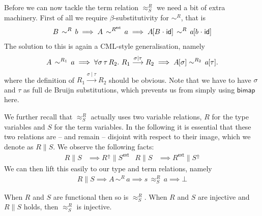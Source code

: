 \documentclass[a4paper,UKenglish]{lipics-v2016}
\newcommand{\ms}{\,}
\newcommand{\mAll}[1]{\ensuremath{\forall} #1.\ms\ms}
\newcommand{\tyr}{\mathrel{\sim}}
\newcommand{\tmr}{\mathrel{\approx}}
\newcommand{\Rext}[1]{\ensuremath{#1^{\mathsf{ext}}}}
\newcommand{\Rshift}[1]{\ensuremath{#1^{\Uparrow}}}
\newcommand{\subst}[1]{\hphantom{|}\!\![{#1}]}
\newcommand{\scons}{\mathbin{\hspace{0.05em}\cdot\hspace{0.05em}}}
\newcommand{\id}{\mathsf{id}}
\begin{document}
Before we can now tackle the term relation $\tmr^R_S$ we need a bit of extra machinery.
First of all we require $\beta$-substitutivity for $\tyr^R$, that is
\begin{align*}
  B\,\tyr^R\,b \implies A\,\tyr^{\Rext{R}}\,a \implies A\subst{B\scons\id}\,\tyr^R\,a\subst{b\scons\id}
\end{align*}
The solution to this is again a CML-style generalisation, namely
\begin{align*}
  A\,\tyr^{R_1}\,a \implies \mAll {\sigma\,\tau\,R_2} R_1\stackrel{\sigma\mid\tau}{\longrightarrow}R_2 \implies A\subst{\sigma} \tyr^{R_2}\,a\subst{\tau}.
\end{align*}
where the definition of $R_1\stackrel{\sigma\mid\tau}{\longrightarrow}R_2$ should be obvious.
Note that we have to have $\sigma$ and $\tau$ as full de Bruijn substitutions, which prevents us from simply using $\mathsf{bimap}$ here.


We further recall that $\tmr^R_S$ actually uses two variable relations, $R$ for the type variables and $S$ for the term variables.
In the following it is essential that these two relations are -- and remain -- disjoint with respect to their image, which we denote as $R \| S$.
We observe the following facts:
\begin{align*}
  R \| S &\implies \Rshift{R} \| \Rext{S} & R \| S &\implies \Rext{R} \| \Rshift{S}
\end{align*}
We can then lift this easily to our type and term relations, namely
\begin{align*}
  R \| S \implies A\,\tyr^R\,a \implies s\,\tmr^R_S\,a \implies \bot
\end{align*}

\begin{lemma}
  When $R$ and $S$ are functional then so is $\tmr^R_S$.
  When $R$ and $S$ are injective and $R \| S$ holds, then $\tmr^R_S$ is injective.
\end{lemma}
\end{document}
